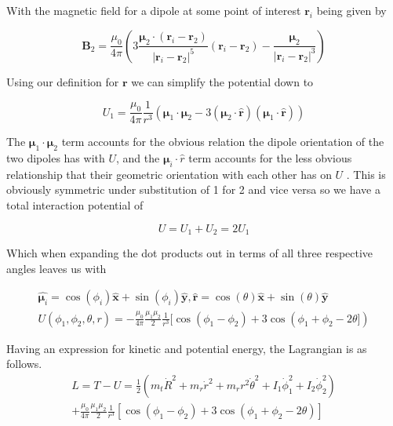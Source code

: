 \documentclass[prbg,preprint]{revtex4-1}
\begin{document}
With the magnetic field for a dipole at some point of interest $\boldsymbol r_i$ being given by \cite{griffiths2013introduction}

\begin{equation}
\boldsymbol B_2 = 
\frac{\mu_0}{4\pi}(
	3\frac{\boldsymbol \mu_2 \cdot (\boldsymbol r_i - \boldsymbol r_2)}{|\boldsymbol r_i - \boldsymbol r_2|^5}(
	\boldsymbol r_i - \boldsymbol r_2
	)
	-\frac{\boldsymbol \mu_2}{|\boldsymbol r_i - \boldsymbol r_2|^3}
)
\end{equation}

Using our definition for $\boldsymbol r$ we can simplify the potential down to

\begin{equation}
U_1 = 
\frac{\mu_0}{4\pi}
\frac{1}{r^3}(
	\boldsymbol \mu_1 \cdot \boldsymbol \mu_2
	-3(
		\boldsymbol \mu_2 \cdot \hat {\boldsymbol r}
		)(
		\boldsymbol \mu_1 \cdot \hat {\boldsymbol r}		
		)
)
\end{equation}

The $\boldsymbol \mu_1 \cdot \boldsymbol \mu_2$ term accounts for the obvious relation the dipole orientation of the two dipoles has with $U$, and the $\boldsymbol \mu_i \cdot \hat r$ term accounts for the less obvious relationship that their geometric orientation with each other has on $U$ .
This is obviously symmetric under substitution of 1 for 2 and vice versa so we have a total interaction potential of

\begin{equation}
U =
U_1+U_2
= 
2U_1
\end{equation}

Which when expanding the dot products out in terms of all three respective angles leaves us with

\begin{equation}
  \begin{multlined}
\hat {\boldsymbol \mu_i} =  \cos(\phi_i)\hat {\boldsymbol x} + \sin(\phi_i)\hat {\boldsymbol y},
\hat {\boldsymbol r} =  \cos(\theta)\hat {\boldsymbol x} + \sin(\theta)\hat {\boldsymbol y}
\\
U(\phi_1, \phi_2, \theta, r) =
-\frac{\mu_0}{4\pi}
\frac{\mu_1 \mu_2}{2}
\frac{1}{r^3}[
	\cos(\phi_1-\phi_2)
	+3\cos(\phi_1+\phi_2 -2\theta]
)
  \end{multlined}
\end{equation}

Having an expression for kinetic and potential energy, the Lagrangian is as follows.
\begin{equation}
  \begin{multlined}
    L=T-U=
    \frac{1}{2}(
        m_t \dot R^2
        +m_r \dot r^2
        +m_r r^2 \dot \theta^2
        + I_1 \dot \phi_1^2
        + I_2 \dot \phi_2^2
    )
    \\
    +
    \frac{\mu_0}{4\pi}
    \frac{\mu_1 \mu_2}{2}
    \frac{1}{r^3}[
        \cos(\phi_1-\phi_2)
        +3\cos(\phi_1+\phi_2 -2\theta)
    ]
  \end{multlined}
\end{equation}
\end{document}
